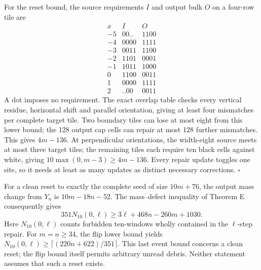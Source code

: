 For the reset bound, the source requirements \(I\) and output bulk \(O\)
on a four-row tile are
\[
\begin{array}{c|c|c}
x&I&O\\\hline
-5&00..&1100\\-4&0000&1111\\-3&0011&1100\\-2&1101&0001\\
-1&1011&1000\\0&1100&0011\\1&0000&1111\\2&..00&0011
\end{array}
\]
A dot imposes no requirement. The exact overlap table checks every vertical
residue, horizontal shift and parallel orientation, giving at least four
mismatches per complete target tile. Two boundary tiles can lose at most
eight from this lower bound; the 128 output cap cells can repair at most
128 further mismatches. This gives \(4m-136\). At perpendicular orientations,
the width-eight source meets at most three target tiles; the remaining
tiles each require ten black cells against white, giving
\(10\max(0,m-3)\ge4m-136\). Every repair update toggles one site, so it
needs at least as many updates as distinct necessary corrections.
\(\square\)

For a clean reset to exactly the complete seed of size \(10m+76\), the
output mass change from \(Y_n\) is \(10m-18n-52\). The mass--defect
inequality of Theorem E consequently gives
\[
 351N_{10}(0,\ell)\ge3\ell+468n-260m+1030.
\]
Here $N_{10}(0,\ell)$ counts forbidden ten-windows wholly contained in
the $\ell$-step repair. For \(m=n\ge34\), the flip lower bound yields
\(N_{10}(0,\ell)\ge\lceil(220n+622)/351\rceil\). This last event bound concerns
a clean reset; the flip bound itself permits arbitrary unread debris.
Neither statement assumes that such a reset exists.
